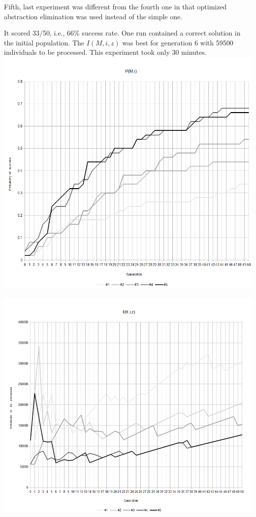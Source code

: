 \documentclass[12pt,a4paper]{report}
\begin{document}

Fifth, last experiment was different from the fourth one in that
optimized abstraction elimination was used instead of the simple one.

It scored 33/50, i.e., 66\% success rate. One run
contained a correct solution in the initial population.
The $I(M,i,z)$ was best for generation 6 with 59500 
individuals to be processed.
This experiment took only 30 minutes. \\



\includegraphics[scale=0.5]{reports/ep/p.png}

\includegraphics[scale=0.5]{reports/ep/i.png}
\end{document}
